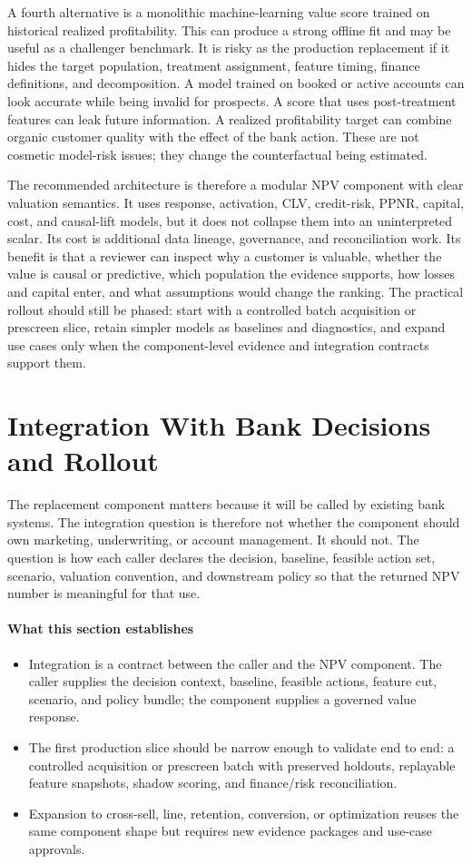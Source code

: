 \documentclass[11pt]{article}
\newcommand{\1}{\mathbf{1}}
\newcommand{\readerbox}[2]{\paragraph{#1}\begin{itemize}[leftmargin=1.5em,itemsep=0.1em,topsep=0.15em]#2\end{itemize}}
\begin{document}
A fourth alternative is a monolithic machine-learning value score trained on
historical realized profitability. This can produce a strong offline fit and
may be useful as a challenger benchmark. It is risky as the production
replacement if it hides the target population, treatment assignment, feature
timing, finance definitions, and decomposition. A model trained on booked or
active accounts can look accurate while being invalid for prospects. A score
that uses post-treatment features can leak future information. A realized
profitability target can combine organic customer quality with the effect of
the bank action. These are not cosmetic model-risk issues; they change the
counterfactual being estimated.

The recommended architecture is therefore a modular NPV component with clear
valuation semantics. It uses response, activation, CLV, credit-risk, PPNR,
capital, cost, and causal-lift models, but it does not collapse them into an
uninterpreted scalar. Its cost is additional data lineage, governance, and
reconciliation work. Its benefit is that a reviewer can inspect why a customer
is valuable, whether the value is causal or predictive, which population the
evidence supports, how losses and capital enter, and what assumptions would
change the ranking. The practical rollout should still be phased: start with a
controlled batch acquisition or prescreen slice, retain simpler models as
baselines and diagnostics, and expand use cases only when the component-level
evidence and integration contracts support them.


\section{Integration With Bank Decisions and Rollout}
\label{sec:v4-integration-rollout}

The replacement component matters because it will be called by existing bank
systems.  The integration question is therefore not whether the component should
own marketing, underwriting, or account management.  It should not.  The
question is how each caller declares the decision, baseline, feasible action set,
scenario, valuation convention, and downstream policy so that the returned NPV
number is meaningful for that use.

\readerbox{What this section establishes}{
  \item Integration is a contract between the caller and the NPV component.
        The caller supplies the decision context, baseline, feasible actions,
        feature cut, scenario, and policy bundle; the component supplies a
        governed value response.
  \item The first production slice should be narrow enough to validate end to
        end: a controlled acquisition or prescreen batch with preserved
        holdouts, replayable feature snapshots, shadow scoring, and finance/risk
        reconciliation.
  \item Expansion to cross-sell, line, retention, conversion, or optimization
        reuses the same component shape but requires new evidence packages and
        use-case approvals.
}
\end{document}
